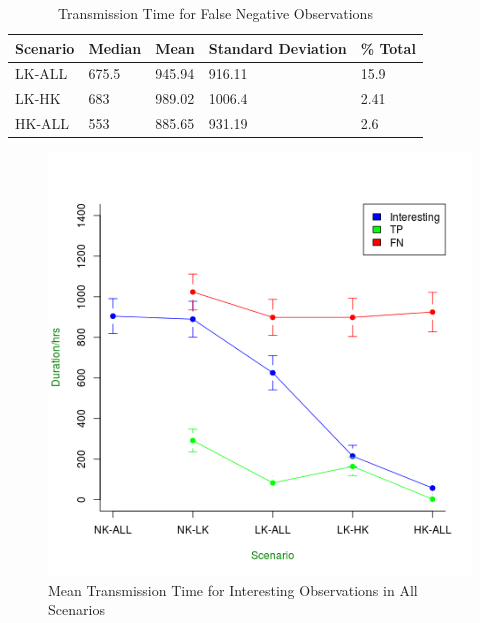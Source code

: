 \begin{table}[h]\footnotesize
\begin{tabularx}{\textwidth}{ |X|X|X|X|X|}
\hline
Scenario & Median & Mean & Standard Deviation & \% Total\\
\hline
LK-ALL & 675.5 & 945.94 & 916.11 & 15.9\\ 
LK-HK & 683 & 989.02 & 1006.4 & 2.41\\
HK-ALL & 553 & 885.65 & 931.19 & 2.6\\
\hline
\end{tabularx}
\caption{Transmission Time for False Negative Observations}\label{tab:observ_fn}
\end{table}

\begin{figure}[!h]
\centering
\includegraphics[width=\textwidth]{Chap7/figures/all_int.png}
\caption{Mean Transmission Time for Interesting Observations in All Scenarios}
\label{fig:all_int}
\end{figure}

